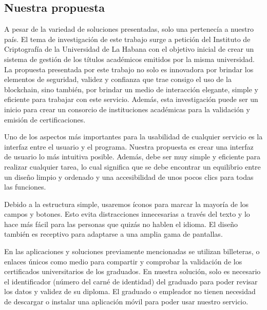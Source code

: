 
\subsection{Nuestra propuesta}
A pesar de la variedad de soluciones presentadas, solo una pertenecía a nuestro país. El tema de investigación de este trabajo surge a petición del Instituto de Criptografía de la Universidad de La Habana con el objetivo inicial de crear un sistema de gestión de los títulos académicos emitidos por la misma universidad. La propuesta presentada por este trabajo no solo es innovadora por brindar los elementos de seguridad, validez y confianza que trae consigo el uso de la blockchain, sino también, por brindar un medio de interacción elegante, simple y eficiente para trabajar con este servicio. Además, esta investigación puede ser un inicio para crear un consorcio de instituciones académicas para la validación y emisión de certificaciones.

Uno de los aspectos más importantes para la usabilidad de cualquier servicio es la interfaz entre el usuario y el programa. Nuestra propuesta es crear una interfaz de usuario lo más intuitiva posible. Además, debe ser muy simple y eficiente para realizar cualquier tarea, lo cual significa que se debe encontrar un equilibrio entre un diseño limpio y ordenado y una accesibilidad de unos pocos clics para todas las funciones.

Debido a la estructura simple, usaremos íconos para marcar la mayoría de los campos y botones. Esto evita distracciones innecesarias a través del texto y lo hace más fácil para las personas que quizás no hablen el idioma. El diseño también es receptivo para adaptarse a una amplia gama de pantallas.

En las aplicaciones y soluciones previamente mencionadas se utilizan billeteras, o enlaces únicos como medio para compartir y comprobar la validación de los certificados universitarios de los graduados. En nuestra solución, solo es necesario el identificador (número del carné de identidad) del graduado para poder revisar los datos y validez de su diploma. El graduado o empleador no tienen necesidad de descargar o instalar una aplicación móvil para poder usar nuestro servicio.

